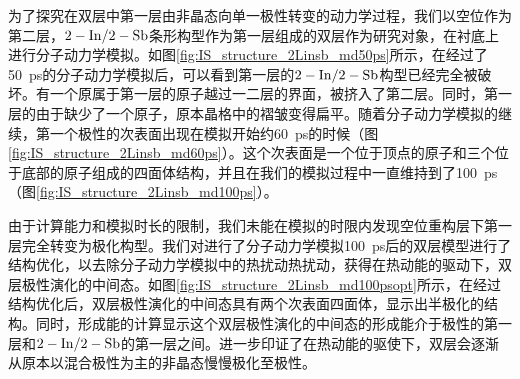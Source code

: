 为了探究在双层中第一层由非晶态向单一极性转变的动力学过程，我们以空位作为第二层，$\rm 2-In/2-Sb$条形构型作为第一层组成的双层作为研究对象，在衬底上进行分子动力学模拟。如图\ref{fig:IS_structure_2Linsb_md50ps}所示，在经过了\SI{50}{\pico\second}的分子动力学模拟后，可以看到第一层的$\rm 2-In/2-Sb$构型已经完全被破坏。有一个原属于第一层的原子越过一二层的界面，被挤入了第二层。同时，第一层的由于缺少了一个原子，原本晶格中的褶皱变得扁平。随着分子动力学模拟的继续，第一个极性的次表面出现在模拟开始约\SI{60}{\pico\second}的时候（图\ref{fig:IS_structure_2Linsb_md60ps}）。这个次表面是一个位于顶点的原子和三个位于底部的原子组成的四面体结构，并且在我们的模拟过程中一直维持到了\SI{100}{\pico\second}（图\ref{fig:IS_structure_2Linsb_md100ps}）。

由于计算能力和模拟时长的限制，我们未能在模拟的时限内发现空位重构层下第一层完全转变为极化构型。我们对进行了分子动力学模拟\SI{100}{\pico\second}后的双层模型进行了结构优化，以去除分子动力学模拟中的热扰动热扰动，获得在热动能的驱动下，双层极性演化的中间态。如图\ref{fig:IS_structure_2Linsb_md100psopt}所示，在经过结构优化后，双层极性演化的中间态具有两个次表面四面体，显示出半极化的结构。同时，形成能的计算显示这个双层极性演化的中间态的形成能介于极性的第一层和$\rm 2-In/2-Sb$的第一层之间。进一步印证了在热动能的驱使下，双层会逐渐从原本以混合极性为主的非晶态慢慢极化至极性。

